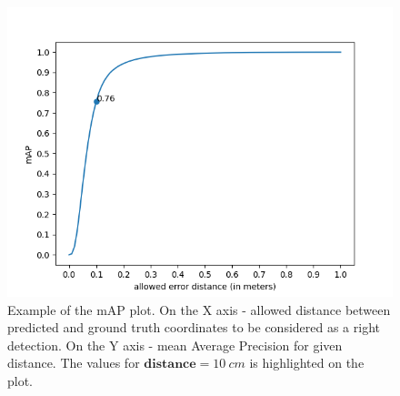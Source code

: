 \begin{figure}[htbp]
    \centerline{\includegraphics[scale=.6]{Figures/example-map.png}}
    \caption{Example of the mAP plot. On the X axis - allowed distance between predicted and ground truth coordinates to be considered as a right detection. On the Y axis - mean Average Precision for given distance. The values for $\textbf{distance} = 10 \ cm$ is highlighted on the plot.}
    \label{img:example-map}
\end{figure}